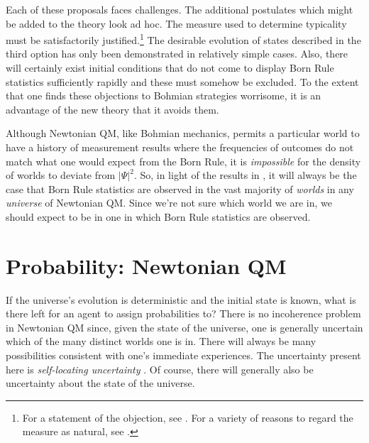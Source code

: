 \documentclass[onecolumn,secnumarabic,balancelastpage,amsmath,amssymb,nofootinbib]{article}
\begin{document}
Each of these proposals faces challenges.  The additional postulates which might be added to the theory look ad hoc.  The measure used to determine typicality must be satisfactorily justified.\footnote{For a statement of the objection, see \citet[]{dickson1998}.  For a variety of reasons to regard the measure as natural, see \citet{struyvegoldstein}.}  The desirable evolution of states described in the third option has only been demonstrated in relatively simple cases.  Also, there will certainly exist initial conditions that do not come to display Born Rule statistics sufficiently rapidly and these must somehow be excluded.  To the extent that one finds these objections to Bohmian strategies worrisome, it is an advantage of the new theory that it avoids them.

Although Newtonian QM, like Bohmian mechanics, permits a particular world to have a history of measurement results where the frequencies of outcomes do not match what one would expect from the Born Rule, it is \emph{impossible} for the density of worlds to deviate from $|\Psi|^2$.  So, in light of the results in \citet{durr1992}, it will always be the case that Born Rule statistics are observed in the vast majority of \emph{worlds} in any \emph{universe} of Newtonian QM.  Since we're not sure which world we are in, we should expect to be in one in which Born Rule statistics are observed.

\section{Probability: Newtonian QM}\label{probNQM}

If the universe's evolution is deterministic and the initial state is known, what is there left for an agent to assign probabilities to?  There is no incoherence problem in Newtonian QM since, given the state of the universe, one is generally uncertain which of the many distinct worlds one is in.  There will always be many possibilities consistent with one's immediate experiences.  The uncertainty present here is \emph{self-locating uncertainty} \citep[see][]{lewis1979}.  Of course, there will generally also be uncertainty about the state of the universe.
\end{document}
